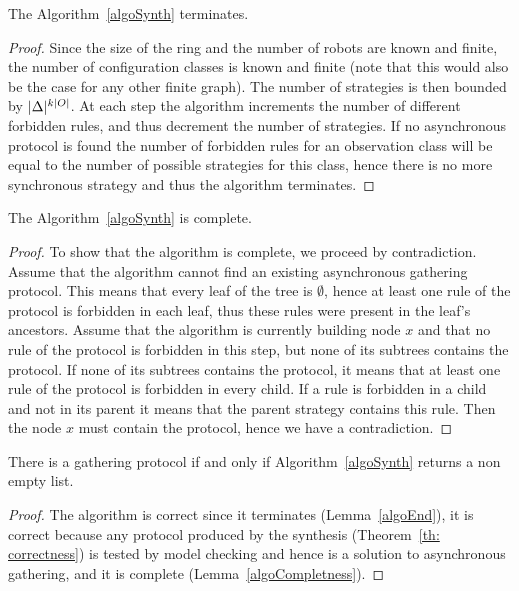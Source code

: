 \begin{lemma}
\label{algoEnd}
The Algorithm~\ref{algoSynth} terminates.
\end{lemma}
\begin{proof}
Since the size of the ring and the number of robots are known and finite, the number of configuration classes is known 
and finite (note that this would also be the case for any other finite graph). 
The number of strategies is then bounded by $|\Delta|^{k |O|}$.
At each step the algorithm increments the number of different forbidden rules, and thus decrement the number of strategies. 
If no asynchronous protocol is found the number of forbidden rules  for an observation class will be equal to
the number of possible strategies for this class, hence there is no more synchronous strategy and 
thus the algorithm terminates.
\end{proof}

\begin{lemma}
\label{algoCompletness}
The Algorithm~\ref{algoSynth} is complete.
\end{lemma}
\begin{proof}
To show that the algorithm is complete, we proceed by contradiction. Assume that the algorithm cannot find 
an existing asynchronous gathering protocol. This means that every leaf of the tree is $\emptyset$, hence 
at least one rule of the protocol is forbidden in each leaf, thus
these rules were present in the leaf's ancestors.
Assume that the algorithm is currently building node $x$ and that no rule of the protocol is forbidden in this step, but 
none of its subtrees contains the protocol. 
If none of its subtrees contains the protocol, it means that at least one rule of the protocol is forbidden
in every child.
If a rule is forbidden in a child and not in its parent it means that the parent strategy contains this rule.
Then the node $x$ must contain the protocol, hence we have a contradiction.
\end{proof}

\begin{theorem}
There is a gathering protocol if and only if Algorithm~\ref{algoSynth} returns a non empty list.
\end{theorem}

\begin{proof}
The algorithm is correct since it terminates (Lemma~\ref{algoEnd}), it is correct because any protocol produced by the synthesis (Theorem~\ref{th: correctness}) is tested by model checking and hence is a solution to asynchronous gathering, and it is complete (Lemma~\ref{algoCompletness}).
\end{proof}


















